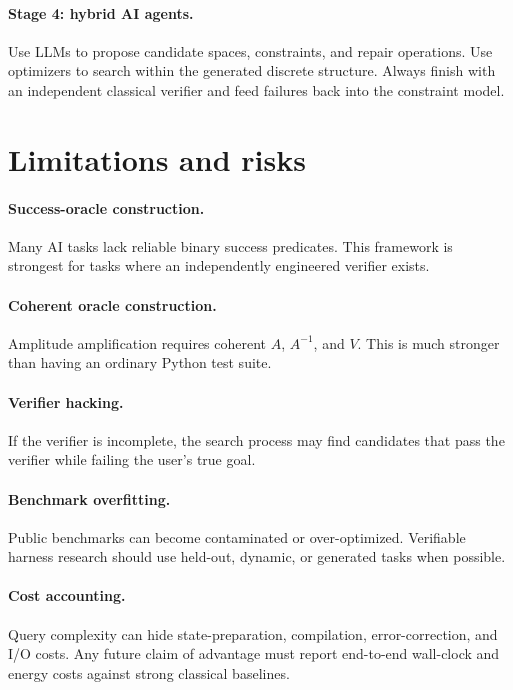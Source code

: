 \documentclass[11pt]{article}
\begin{document}
\paragraph{Stage 4: hybrid AI agents.} Use LLMs to propose candidate spaces, constraints, and repair operations. Use optimizers to search within the generated discrete structure. Always finish with an independent classical verifier and feed failures back into the constraint model.

\section{Limitations and risks}

\paragraph{Success-oracle construction.} Many AI tasks lack reliable binary success predicates. This framework is strongest for tasks where an independently engineered verifier exists.

\paragraph{Coherent oracle construction.} Amplitude amplification requires coherent $A$, $A^{-1}$, and $V$. This is much stronger than having an ordinary Python test suite.

\paragraph{Verifier hacking.} If the verifier is incomplete, the search process may find candidates that pass the verifier while failing the user's true goal.

\paragraph{Benchmark overfitting.} Public benchmarks can become contaminated or over-optimized. Verifiable harness research should use held-out, dynamic, or generated tasks when possible.

\paragraph{Cost accounting.} Query complexity can hide state-preparation, compilation, error-correction, and I/O costs. Any future claim of advantage must report end-to-end wall-clock and energy costs against strong classical baselines.
\end{document}
